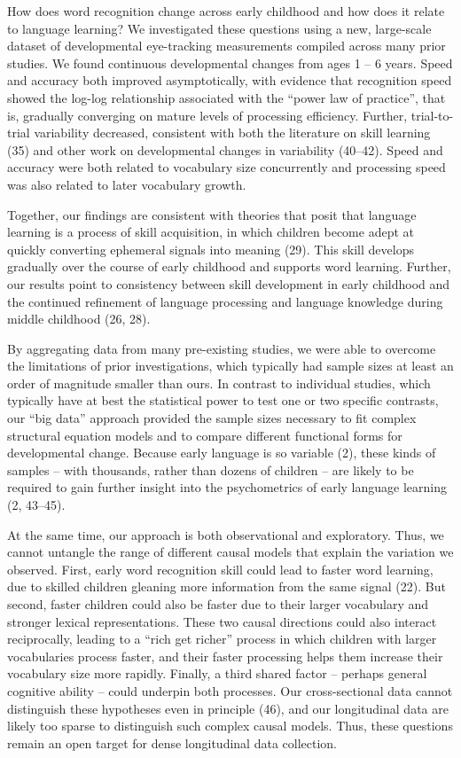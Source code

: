 \documentclass[9pt,twocolumn,twoside,]{pnas-new}
\begin{document}
How does word recognition change across early childhood and how does it
relate to language learning? We investigated these questions using a
new, large-scale dataset of developmental eye-tracking measurements
compiled across many prior studies. We found continuous developmental
changes from ages 1 -- 6 years. Speed and accuracy both improved
asymptotically, with evidence that recognition speed showed the log-log
relationship associated with the ``power law of practice'', that is,
gradually converging on mature levels of processing efficiency. Further,
trial-to-trial variability decreased, consistent with both the
literature on skill learning (35) and other work on developmental
changes in variability (40--42). Speed and accuracy were both related to
vocabulary size concurrently and processing speed was also related to
later vocabulary growth.

Together, our findings are consistent with theories that posit that
language learning is a process of skill acquisition, in which children
become adept at quickly converting ephemeral signals into meaning (29).
This skill develops gradually over the course of early childhood and
supports word learning. Further, our results point to consistency
between skill development in early childhood and the continued
refinement of language processing and language knowledge during middle
childhood (26, 28).

By aggregating data from many pre-existing studies, we were able to
overcome the limitations of prior investigations, which typically had
sample sizes at least an order of magnitude smaller than ours. In
contrast to individual studies, which typically have at best the
statistical power to test one or two specific contrasts, our ``big
data'' approach provided the sample sizes necessary to fit complex
structural equation models and to compare different functional forms for
developmental change. Because early language is so variable (2), these
kinds of samples -- with thousands, rather than dozens of children --
are likely to be required to gain further insight into the psychometrics
of early language learning (2, 43--45).

At the same time, our approach is both observational and exploratory.
Thus, we cannot untangle the range of different causal models that
explain the variation we observed. First, early word recognition skill
could lead to faster word learning, due to skilled children gleaning
more information from the same signal (22). But second, faster children
could also be faster due to their larger vocabulary and stronger lexical
representations. These two causal directions could also interact
reciprocally, leading to a ``rich get richer'' process in which children
with larger vocabularies process faster, and their faster processing
helps them increase their vocabulary size more rapidly. Finally, a third
shared factor -- perhaps general cognitive ability -- could underpin
both processes. Our cross-sectional data cannot distinguish these
hypotheses even in principle (46), and our longitudinal data are likely
too sparse to distinguish such complex causal models. Thus, these
questions remain an open target for dense longitudinal data collection.
\end{document}
